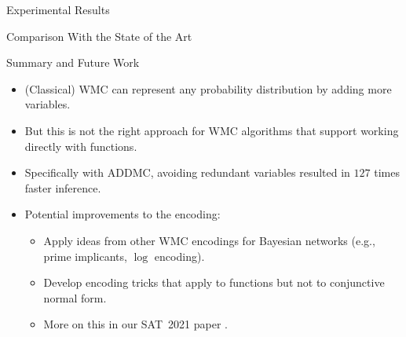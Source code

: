 \documentclass{beamer}
\begin{document}
\begin{frame}{Experimental Results}
  \centering
  
\end{frame}

%   

\begin{frame}{Comparison With the State of the Art}
  \centering
  
\end{frame}

\begin{frame}{Summary and Future Work}
  \begin{itemize}
  \item (Classical) WMC can represent any probability distribution by adding
    more variables.
  \item But this is not the right approach for WMC algorithms that support
    working directly with functions.
  \item Specifically with ADDMC, avoiding redundant variables resulted in
    \alert{$127$} times faster inference.
  \end{itemize}
  \begin{itemize}
  \item Potential improvements to the encoding:
    \begin{itemize}
    \item Apply ideas from other WMC encodings for Bayesian networks (e.g.,
      prime implicants, $\log$ encoding).
    \item Develop encoding tricks that apply to functions but not to conjunctive
      normal form.
    \item More on this in our SAT~2021 paper \emph{}.
    \end{itemize}
  \end{itemize}
\end{frame}
\end{document}
